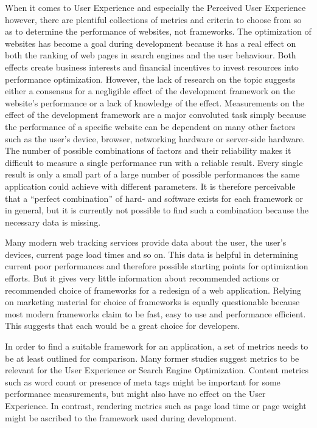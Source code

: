 \documentclass[a4paper, 12pt]{article}
\begin{document}
When it comes to User Experience and especially the Perceived User Experience however, there are plentiful collections of metrics and criteria to choose from so as to determine the performance of websites, not frameworks.
The optimization of websites has become a goal during development because it has a real effect on both the ranking of web pages in search engines and the user behaviour.
Both effects create business interests and financial incentives to invest resources into performance optimization.
However, the lack of research on the topic suggests either a consensus for a negligible effect of the development framework on the website's performance or a lack of knowledge of the effect.
Measurements on the effect of the development framework are a major convoluted task simply because the performance of a specific website can be dependent on many other factors such as the user's device, browser, networking hardware or server-side hardware.
The number of possible combinations of factors and their reliability makes it difficult to measure a single performance run with a reliable result.
Every single result is only a small part of a large number of possible performances the same application could achieve with different parameters.
It is therefore perceivable that a \enquote{perfect combination} of hard- and software exists for each framework or in general, but it is currently not possible to find such a combination because the necessary data is missing.

Many modern web tracking services provide data about the user, the user's devices, current page load times and so on.
This data is helpful in determining current poor performances and therefore possible starting points for optimization efforts.
But it gives very little information about recommended actions or recommended choice of frameworks for a redesign of a web application.
Relying on marketing material for choice of frameworks is equally questionable because most modern frameworks claim to be fast, easy to use and performance efficient.
This suggests that each would be a great choice for developers.

In order to find a suitable framework for an application, a set of metrics needs to be at least outlined for comparison.
Many former studies suggest metrics to be relevant for the User Experience or Search Engine Optimization.
Content metrics such as word count or presence of meta tags might be important for some performance measurements, but might also have no effect on the User Experience.
In contrast, rendering metrics such as page load time or page weight might be ascribed to the framework used during development.
\end{document}
